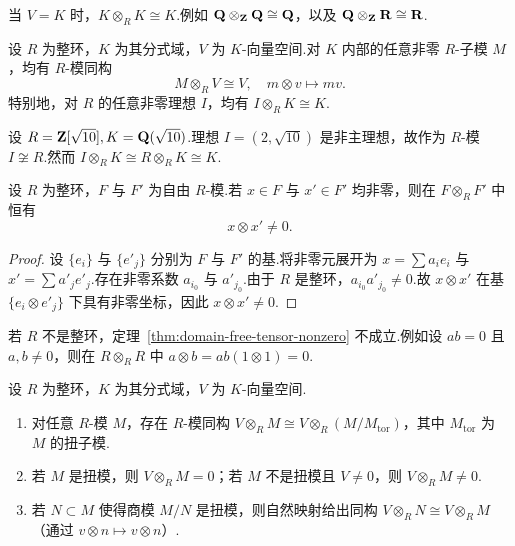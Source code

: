 \begin{example}\label{ex:q-tensor-q}
当 $V = K$ 时，$K \otimes_R K \cong K$.例如 $\mathbf{Q} \otimes_{\mathbf{Z}} \mathbf{Q} \cong \mathbf{Q}$，以及 $\mathbf{Q} \otimes_{\mathbf{Z}} \mathbf{R} \cong \mathbf{R}$.
\end{example}

\begin{theorem}\label{thm:submodule-k-tensor}
设 $R$ 为整环，$K$ 为其分式域，$V$ 为 $K$-向量空间.对 $K$ 内部的任意非零 $R$-子模 $M$，均有 $R$-模同构
\[
  M \otimes_R V \cong V, \quad m \otimes v \mapsto mv.
\]
特别地，对 $R$ 的任意非零理想 $I$，均有 $I \otimes_R K \cong K$.
\end{theorem}

\begin{example}\label{ex:ideal-nonprincipal}
设 $R = \mathbf{Z}[\sqrt{10}], K = \mathbf{Q}(\sqrt{10})$.理想 $I = (2, \sqrt{10})$ 是非主理想，故作为 $R$-模 $I \not\cong R$.然而 $I \otimes_R K \cong R \otimes_R K \cong K$.
\end{example}

\begin{theorem}\label{thm:domain-free-tensor-nonzero}
设 $R$ 为整环，$F$ 与 $F'$ 为自由 $R$-模.若 $x \in F$ 与 $x' \in F'$ 均非零，则在 $F \otimes_R F'$ 中恒有
\[
  x \otimes x' \neq 0.
\]
\end{theorem}

\begin{proof}
设 $\{e_i\}$ 与 $\{e'_j\}$ 分别为 $F$ 与 $F'$ 的基.将非零元展开为 $x = \sum a_i e_i$ 与 $x' = \sum a'_j e'_j$.存在非零系数 $a_{i_0}$ 与 $a'_{j_0}$.由于 $R$ 是整环，$a_{i_0} a'_{j_0} \neq 0$.故 $x \otimes x'$ 在基 $\{e_i \otimes e'_j\}$ 下具有非零坐标，因此 $x \otimes x' \neq 0$.
\end{proof}

\begin{remark}\label{rem:domain-counterexample}
若 $R$ 不是整环，定理~\ref{thm:domain-free-tensor-nonzero} 不成立.例如设 $ab = 0$ 且 $a, b \neq 0$，则在 $R \otimes_R R$ 中 $a \otimes b = ab(1 \otimes 1) = 0$.
\end{remark}

\begin{theorem}\label{thm:domain-torsion-behavior}
设 $R$ 为整环，$K$ 为其分式域，$V$ 为 $K$-向量空间.
\begin{enumerate}
  \item 对任意 $R$-模 $M$，存在 $R$-模同构 $V \otimes_R M \cong V \otimes_R (M/M_{\mathrm{tor}})$，其中 $M_{\mathrm{tor}}$ 为 $M$ 的扭子模.
  \item 若 $M$ 是扭模，则 $V \otimes_R M = 0$；若 $M$ 不是扭模且 $V \neq 0$，则 $V \otimes_R M \neq 0$.
  \item 若 $N \subset M$ 使得商模 $M/N$ 是扭模，则自然映射给出同构 $V \otimes_R N \cong V \otimes_R M$（通过 $v \otimes n \mapsto v \otimes n$）.
\end{enumerate}
\end{theorem}

